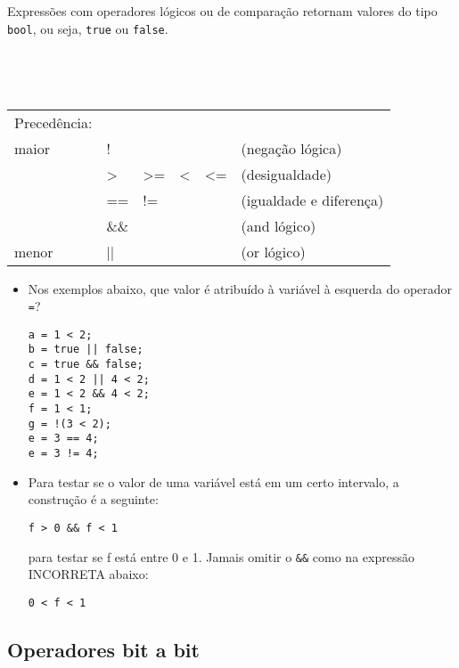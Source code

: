 \documentclass{book}
\begin{document}
Expressões com operadores lógicos ou de comparação retornam valores do tipo {\tt bool}, ou seja, {\tt true} ou {\tt false}.

~\\

{\tt
\begin{tabular}{|l|lllll|}
\hline
Precedência:        &      &    &    &    &                                    \\
maior               & !    &    &    &    & (negação lógica)                   \\
                    & >    & >= & <  & <= & (desigualdade)                     \\
                    & ==   & != &    &    & (igualdade e diferença)            \\
                    & \&\& &    &    &    & (and lógico)                       \\
menor               & ||   &    &    &    & (or lógico)                        \\
\hline
\end{tabular}
}

\begin{itemize}

\item Nos exemplos abaixo, que valor é atribuído à variável à esquerda do operador {\tt =}?

\begin{lstlisting}
a = 1 < 2;
b = true || false;
c = true && false;
d = 1 < 2 || 4 < 2;
e = 1 < 2 && 4 < 2;
f = 1 < 1;
g = !(3 < 2);
e = 3 == 4;
e = 3 != 4;
\end{lstlisting}

\item Para testar se o valor de uma variável está em um certo intervalo, a construção é a seguinte: 

\begin{lstlisting}
f > 0 && f < 1
\end{lstlisting}

para testar se f está entre 0 e 1. Jamais omitir o {\tt \&\&} como na expressão INCORRETA abaixo:

\begin{lstlisting}
0 < f < 1
\end{lstlisting}

\end{itemize}

\subsection{Operadores bit a bit}
\end{document}
